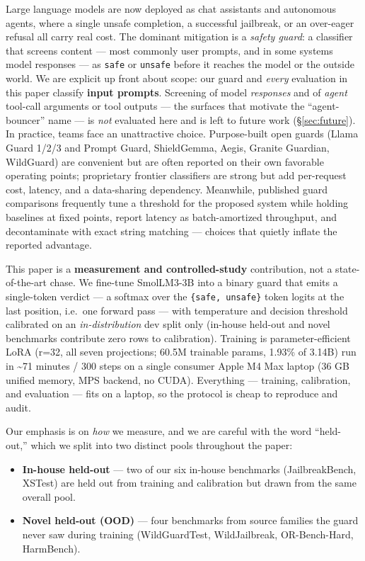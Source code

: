 \documentclass[sigconf,nonacm]{acmart}
\begin{document}
Large language models are now deployed as chat assistants and autonomous agents, where a single unsafe completion, a successful jailbreak, or an over-eager refusal all carry real cost. The dominant mitigation is a \emph{safety guard}: a classifier that screens content --- most commonly user prompts, and in some systems model responses --- as \texttt{safe} or \texttt{unsafe} before it reaches the model or the outside world. We are explicit up front about scope: our guard and \emph{every} evaluation in this paper classify \textbf{input prompts}. Screening of model \emph{responses} and of \emph{agent} tool-call arguments or tool outputs --- the surfaces that motivate the ``agent-bouncer'' name --- is \emph{not} evaluated here and is left to future work (\S\ref{sec:future}). In practice, teams face an unattractive choice. Purpose-built open guards (Llama Guard 1/2/3 and Prompt Guard, ShieldGemma, Aegis, Granite Guardian, WildGuard) are convenient but are often reported on their own favorable operating points; proprietary frontier classifiers are strong but add per-request cost, latency, and a data-sharing dependency. Meanwhile, published guard comparisons frequently tune a threshold for the proposed system while holding baselines at fixed points, report latency as batch-amortized throughput, and decontaminate with exact string matching --- choices that quietly inflate the reported advantage.

This paper is a \textbf{measurement and controlled-study} contribution, not a state-of-the-art chase. We fine-tune SmolLM3-3B into a binary guard that emits a single-token verdict --- a softmax over the \texttt{\{safe, unsafe\}} token logits at the last position, i.e.\ one forward pass --- with temperature and decision threshold calibrated on an \emph{in-distribution} dev split only (in-house held-out and novel benchmarks contribute zero rows to calibration). Training is parameter-efficient LoRA (r=32, all seven projections; 60.5M trainable params, 1.93\% of 3.14B) run in \textasciitilde{}71 minutes / 300 steps on a single consumer Apple M4 Max laptop (36 GB unified memory, MPS backend, no CUDA). Everything --- training, calibration, and evaluation --- fits on a laptop, so the protocol is cheap to reproduce and audit.

Our emphasis is on \emph{how} we measure, and we are careful with the word ``held-out,'' which we split into two distinct pools throughout the paper:

\begin{itemize}
  \item \textbf{In-house held-out} --- two of our six in-house benchmarks (JailbreakBench, XSTest) are held out from training and calibration but drawn from the same overall pool.
  \item \textbf{Novel held-out (OOD)} --- four benchmarks from source families the guard never saw during training (WildGuardTest, WildJailbreak, OR-Bench-Hard, HarmBench).
\end{itemize}
\end{document}
